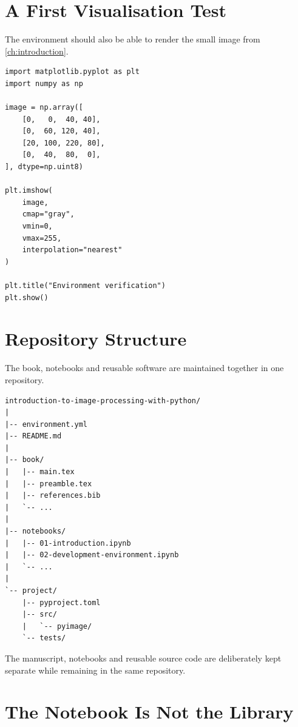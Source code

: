 \section{A First Visualisation Test}
\label{sec:first-visualisation-test}

The environment should also be able to render the small image from
\cref{ch:introduction}.

\begin{listing}[htbp]
    \caption{Testing NumPy and Matplotlib inside the conda environment.}
    \label{lst:first-visualisation-test}

\begin{verbatim}
import matplotlib.pyplot as plt
import numpy as np

image = np.array([
    [0,   0,  40, 40],
    [0,  60, 120, 40],
    [20, 100, 220, 80],
    [0,  40,  80,  0],
], dtype=np.uint8)

plt.imshow(
    image,
    cmap="gray",
    vmin=0,
    vmax=255,
    interpolation="nearest"
)

plt.title("Environment verification")
plt.show()
\end{verbatim}

\end{listing}


\section{Repository Structure}
\label{sec:repository-structure}

The book, notebooks and reusable software are maintained together in
one repository.

\begin{verbatim}
introduction-to-image-processing-with-python/
|
|-- environment.yml
|-- README.md
|
|-- book/
|   |-- main.tex
|   |-- preamble.tex
|   |-- references.bib
|   `-- ...
|
|-- notebooks/
|   |-- 01-introduction.ipynb
|   |-- 02-development-environment.ipynb
|   `-- ...
|
`-- project/
    |-- pyproject.toml
    |-- src/
    |   `-- pyimage/
    `-- tests/
\end{verbatim}

The manuscript, notebooks and reusable source code are deliberately
kept separate while remaining in the same repository.


\section{The Notebook Is Not the Library}
\label{sec:notebook-not-library}

